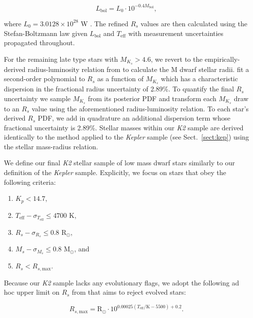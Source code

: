 \documentclass[twocolumn]{emulateapj}
\newcommand{\kepler}[1]{\emph{Kepler}#1}
\newcommand{\ktwo}[1]{\emph{K2}#1}
\newcommand{\teff}[1]{$T_{\text{eff}}$#1}
\begin{document}
\begin{equation}
  L_{\text{bol}} = L_0 \cdot 10^{-0.4 M_{\text{bol}}},
\end{equation}

\noindent where $L_0 = 3.0128 \times 10^{28}$ W \citep{mamajek15}. The refined $R_s$ values
are then calculated using the Stefan-Boltzmann law given $L_{\text{bol}}$ and \teff{} with measurement uncertainties
propagated throughout.

For the remaining late type stars with $M_{K_s}>4.6$, we revert to the empirically-derived radius-luminosity relation
from \cite{mann15} to calculate the M dwarf stellar radii. \cite{mann15} fit a second-order polynomial to $R_s$ as
a function of $M_{K_s}$ which has a characteristic dispersion in the fractional radius uncertainty of 2.89\%. To quantify
the final $R_s$ uncertainty we sample $M_{K_s}$ from its posterior PDF and transform each $M_{K_s}$ draw to an $R_s$ value
using the aforementioned radius-luminosity relation. To each star's derived $R_s$ PDF, we add in quadrature an additional
dispersion term whose fractional uncertainty is 2.89\%. Stellar masses within our \ktwo{} sample are derived
identically to the method applied to the \kepler{} sample (see Sect.~\ref{sect:kep}) using the \cite{boyajian12} stellar
mass-radius relation. 

We define our final \ktwo{} stellar sample of low mass dwarf stars similarly to our definition of the \kepler{} sample.
Explicitly, we focus on stars that obey the following criteria:

\begin{enumerate}
\item $K_p < 14.7$,
\item $T_{\text{eff}} - \sigma_{T_{\text{eff}}} \leq 4700$ K,
\item $R_s - \sigma_{R_s} \leq 0.8$ R$_{\odot}$,
\item $M_s - \sigma_{M_s} \leq 0.8$ M$_{\odot}$, and
\item $R_s < R_{s,\text{max}}$.
\end{enumerate}

\noindent Because our \ktwo{} sample lacks any evolutionary flags, we adopt the following ad hoc upper limit on $R_s$
from \cite{fulton17} that aims to reject evolved stars:

\begin{equation}
  R_{s,\text{max}} = \text{R}_{\odot} \cdot 10^{0.00025(T_{\text{eff}}/\text{K}-5500)+0.2}.
\end{equation}
\end{document}
